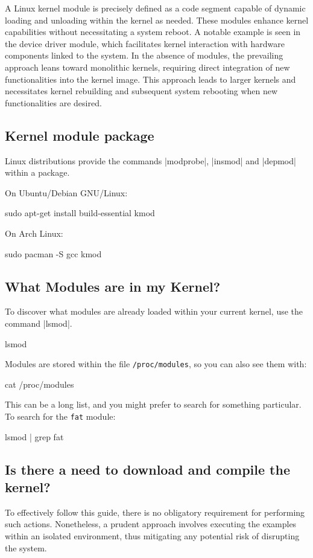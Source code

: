\documentclass[10pt, oneside]{book}
\begin{document}
A Linux kernel module is precisely defined as a code segment capable of dynamic loading and unloading within the kernel as needed.
These modules enhance kernel capabilities without necessitating a system reboot.
A notable example is seen in the device driver module, which facilitates kernel interaction with hardware components linked to the system.
In the absence of modules, the prevailing approach leans toward monolithic kernels,
requiring direct integration of new functionalities into the kernel image.
This approach leads to larger kernels and necessitates kernel rebuilding and subsequent system rebooting when new functionalities are desired.

\subsection{Kernel module package}
\label{sec:packages}

Linux distributions provide the commands \sh|modprobe|, \sh|insmod| and \sh|depmod| within a package.

On Ubuntu/Debian GNU/Linux:
\begin{codebash}
sudo apt-get install build-essential kmod
\end{codebash}

On Arch Linux:
\begin{codebash}
sudo pacman -S gcc kmod
\end{codebash}

\subsection{What Modules are in my Kernel?}
\label{sec:modutils}

To discover what modules are already loaded within your current kernel, use the command \sh|lsmod|.
\begin{codebash}
lsmod
\end{codebash}

Modules are stored within the file \verb|/proc/modules|, so you can also see them with:
\begin{codebash}
cat /proc/modules
\end{codebash}

This can be a long list, and you might prefer to search for something particular.
To search for the \verb|fat| module:
\begin{codebash}
lsmod | grep fat
\end{codebash}

\subsection{Is there a need to download and compile the kernel?}
\label{sec:buildkernel}
To effectively follow this guide, there is no obligatory requirement for performing such actions.
Nonetheless, a prudent approach involves executing the examples within an isolated environment,
thus mitigating any potential risk of disrupting the system.
\end{document}
